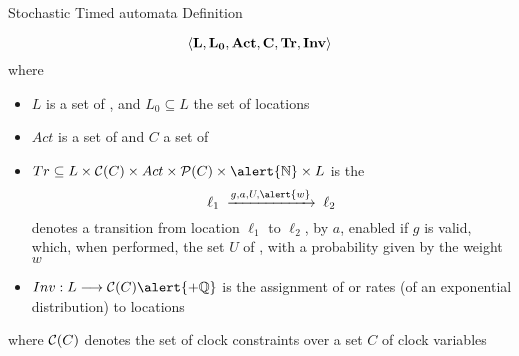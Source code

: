 \documentclass[aspectratio=169]{beamer}
\begin{document}
\begin{slide}{Stochastic Timed automata Definition}
\small

\vspace*{-1mm}
\begin{equation*}
\mathbf{\langle L, L_0, Act, C, Tr, Inv \rangle}
\end{equation*}
\vspace*{-1mm}
where
\vspace*{-1mm}
\begin{itemize}
\item $L$ is a set of , and $L_0 \subseteq L$ the set of  locations
\item $Act$ is a set of  and $C$ a set of 
\item $Tr \subseteq L \times \cc{C} \times Act \times \pow{(C)} \times \alert{\N} \times L$ is the 
\vspace*{-1mm}
\begin{equation*}
\ell_1\; \trans{g,a,U,\alert{w}}\;  \ell_2
\end{equation*}
\vspace*{-1mm}
denotes a transition from location $\ell_1$ to $\ell_2$,  by $a$, enabled if  $g$
is valid, which, when performed,  the set $U$ of , \alert{with a probability given by the weight~$w$}
\item $\fdec{Inv}{L}{\cc{C}\alert{+ \mathbb{Q}}}$ is the assignment of  \alert{or rates (of an exponential distribution)} to locations  
\end{itemize}
\vspace*{-1mm}
where $\mathcal{C}(C)$ denotes the  set of clock constraints over a set $C$ of clock variables
\end{slide}
\end{document}
